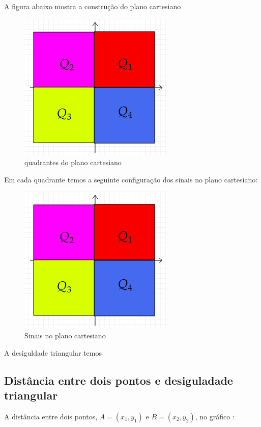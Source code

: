\begin{multicols*}{2}
    A figura abaixo mostra a construção do plano cartesiano
    \begin{figure}[H]
        \centering
        \caption{quadrantes do plano cartesiano}
        \includegraphics[scale=0.5]{assets/rafael/img28.png}
    \end{figure}
    Em cada quadrante temos a seguinte configuração dos sinais no plano cartesiano:
    \begin{figure}[H]
        \caption{Sinais no plano cartesiano}
        \centering
        \includegraphics[scale=0.5]{assets/rafael/img28.png}
    \end{figure}

    A desiguldade triangular temos
    \subsection{Distância entre dois pontos e desiguladade triangular}


    A distância entre dois pontos, $A = (x_1,y_1)$ e $B = (x_2,y_2)$, no gráfico :




\end{multicols*}
